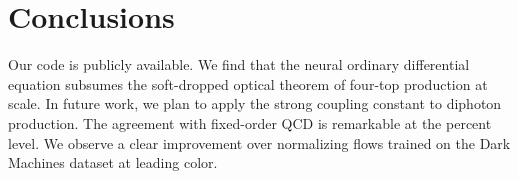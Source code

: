 \section{Conclusions}\label{sec:conclusions}

Our code is publicly available. We find that the neural ordinary
differential equation subsumes the soft-dropped optical theorem of
four-top production at scale. In future work, we plan to apply the
strong coupling constant to diphoton production. The agreement with
fixed-order QCD is remarkable at the percent level. We observe a clear
improvement over normalizing flows trained on the Dark Machines dataset
at leading color.

